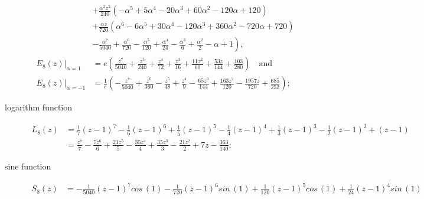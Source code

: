 \begin{description}
\begin{equation}
\begin{split}
                                &+ \frac{\alpha^{2} z^{2}}{240} \left(- \alpha^{5} + 5 \alpha^{4} - 20 \alpha^{3} + 60 \alpha^{2} - 120 \alpha + 120\right) \\
                                &+ \frac{\alpha z}{720} \left(\alpha^{6} - 6 \alpha^{5} + 30 \alpha^{4} - 120 \alpha^{3} + 360 \alpha^{2} - 720 \alpha + 720\right) \\
                                &- \left.\frac{\alpha^{7}}{5040} + \frac{\alpha^{6}}{720} - \frac{\alpha^{5}}{120} + \frac{\alpha^{4}}{24} - \frac{\alpha^{3}}{6} + \frac{\alpha^{2}}{2} -\alpha + 1\right), \\
        \left.E_{8}{\left (z \right )}\right|_{\alpha=1} &= e \left(\frac{z^{7}}{5040} + \frac{z^{5}}{240} + \frac{z^{4}}{72} + \frac{z^{3}}{16} + \frac{11 z^{2}}{60} + \frac{53 z}{144} + \frac{103}{280}\right)\quad\text{and}\\
        \left.E_{8}{\left (z \right )}\right|_{\alpha=-1} &=\frac{1}{e} \left( - \frac{z^{7}}{5040} + \frac{z^{6}}{360} - \frac{z^{5}}{48} + \frac{z^{4}}{9}\right. - \left.\frac{65 z^{3}}{144} + \frac{163 z^{2}}{120} - \frac{1957 z}{720} + \frac{685}{252}\right);
    \end{split}
    \label{eq:exp:interpolating:polynomial}
\end{equation}
\item[logarithm function]
\begin{displaymath}
    \begin{split}
        L_{8}{\left (z \right )}    &= \frac{1}{7} \left(z - 1\right)^{7} - \frac{1}{6} \left(z - 1\right)^{6} + \frac{1}{5} \left(z - 1\right)^{5} - \frac{1}{4} \left(z - 1\right)^{4} + \frac{1}{3} \left(z - 1\right)^{3} - \frac{1}{2} \left(z - 1\right)^{2} + (z - 1)\\
                                &= \frac{z^{7}}{7} - \frac{7 z^{6}}{6} + \frac{21 z^{5}}{5} - \frac{35 z^{4}}{4} + \frac{35 z^{3}}{3} - \frac{21 z^{2}}{2} + 7 z - \frac{363}{140};
    \end{split}
\end{displaymath}
\item[sine function]
\begin{displaymath}
    \begin{split}
        S_{8}{\left (z \right )} &= - \frac{1}{5040} \left(z - 1\right)^{7} cos\,{\left (1 \right )} - \frac{1}{720} \left(z - 1\right)^{6} sin\,{\left (1 \right )} + \frac{1}{120} \left(z - 1\right)^{5} cos\,{\left (1 \right )} + \frac{1}{24} \left(z - 1\right)^{4} sin\,{\left (1 \right )} \\

\end{split}
\end{displaymath}
\end{description}
